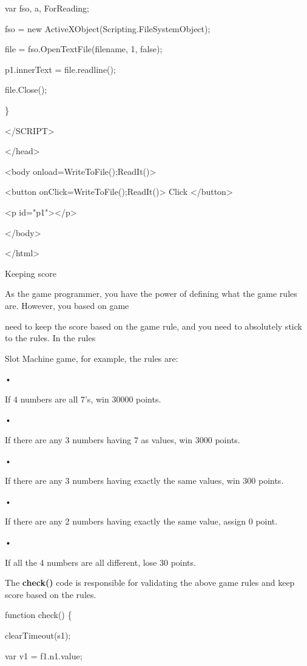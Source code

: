 \documentclass[
]{article}
\begin{document}
var fso, a, ForReading;

fso = new
ActiveXObject(\textquotesingle Scripting.FileSystemObject\textquotesingle);

file = fso.OpenTextFile(filename, 1, false);

p1.innerText = file.readline();

file.Close();

\}

\textless/SCRIPT\textgreater{}

\textless/head\textgreater{}

\textless body
onload=\textquotesingle WriteToFile();ReadIt()\textquotesingle\textgreater{}

\textless button
onClick=\textquotesingle WriteToFile();ReadIt()\textquotesingle\textgreater{}
Click \textless/button\textgreater{}

\textless p id="p1"\textgreater\textless/p\textgreater{}

\textless/body\textgreater{}

\textless/html\textgreater{}

Keeping score

As the game programmer, you have the power of defining what the game
rules are. However, you based on game

need to keep the score based on the game rule, and you need to
absolutely stick to the rules. In the rules

Slot Machine game, for example, the rules are:

•

If 4 numbers are all 7's, win 30000 points.

•

If there are any 3 numbers having 7 as values, win 3000 points.

•

If there are any 3 numbers having exactly the same values, win 300
points.

•

If there are any 2 numbers having exactly the same value, assign 0
point.

•

If all the 4 numbers are all different, lose 30 points.

The \textbf{check()} code is responsible for validating the above game
rules and keep score based on the rules.

function check() \{

clearTimeout(s1);

var v1 = f1.n1.value;
\end{document}
